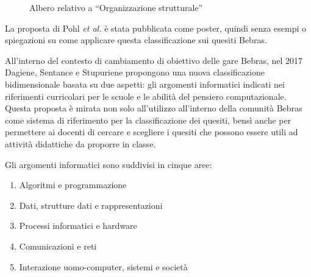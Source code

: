 \documentclass[12pt]{report}
\begin{document}
\begin{figure}[H]
	\centering
	 \label{Organizzazione strutturale}
	\caption{Albero relativo a ``Organizzazione strutturale'' \cite{PohlLNCS2015}}
\end{figure}



La proposta di Pohl \textit{et al.} \cite{PohlLNCS2015} è stata pubblicata come poster, quindi senza esempi o spiegazioni su come applicare questa classificazione sui quesiti Bebras.

All'interno del contesto di cambiamento di obiettivo delle gare Bebras, nel 2017 Dagiene, Sentance e Stupuriene \cite{DagieneINFORMATICA2017} propongono una nuova classificazione bidimensionale basata su due aspetti: gli argomenti informatici indicati nei riferimenti curricolari per le scuole e le abilità del pensiero computazionale.
Questa proposta è mirata non solo all'utilizzo all'interno della comunità Bebras come sistema di riferimento per la classificazione dei quesiti, bensì anche per permettere ai docenti di cercare e scegliere i quesiti che possono essere utili ad attività didattiche da proporre in classe.


Gli argomenti informatici sono suddivisi in cinque aree:
\begin{enumerate}
	\item Algoritmi e programmazione
	\item Dati, strutture dati e rappresentazioni
	\item Processi informatici e hardware
	\item Comunicazioni e reti
	\item Interazione uomo-computer, sistemi e società
\end{enumerate}
\end{document}
